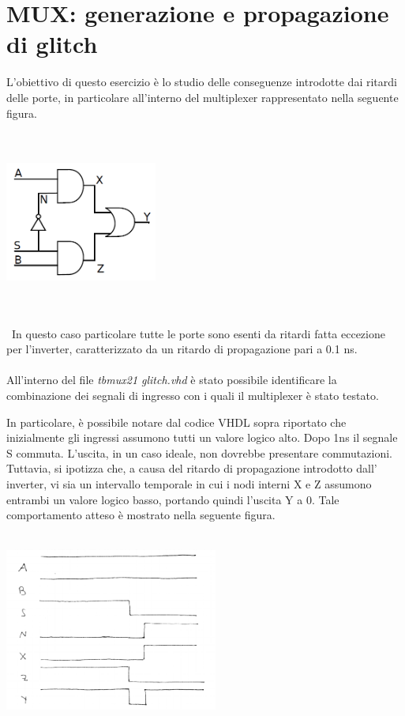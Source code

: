 \documentclass[11pt,  english, makeidx, a4paper, titlepage, oneside]{book}
\newenvironment{listato}{\footnotesize} {\normalsize }
\begin{document}
\section{MUX: generazione e propagazione di glitch}
L'obiettivo di questo esercizio è lo studio delle conseguenze 
introdotte dai ritardi delle porte, in particolare all'interno del
multiplexer rappresentato nella seguente figura.
\\\\\
\centerline{\includegraphics[width=5cm]{./img/Lab_1/Es_4/Mux.png}}
\\\\\
In questo caso particolare tutte le porte sono esenti da ritardi fatta
eccezione per l'inverter, caratterizzato da un ritardo di propagazione
pari a 0.1 ns.
\\\\
All'interno del file \textit{tb\textunderscore mux21\textunderscore
glitch.vhd} è stato possibile identificare la combinazione 
dei segnali di ingresso con i quali il multiplexer è stato
testato.
\begin{center}
\begin{listato}
	\centerline{}
\end{listato}
\end{center}
In particolare, è possibile notare dal codice VHDL sopra riportato
che inizialmente gli ingressi assumono tutti un valore logico alto.
Dopo 1ns il segnale S commuta. L'uscita, in un caso ideale, non dovrebbe
presentare commutazioni.
\\
Tuttavia, si ipotizza che, a causa del ritardo di propagazione introdotto dall'
inverter, vi sia un intervallo temporale in cui i nodi interni X e Z 
assumono entrambi un valore logico basso, portando quindi l'uscita Y a 0. Tale comportamento atteso è mostrato nella seguente figura.
\\\\
\centerline{\includegraphics[width=7cm]{./img/Lab_1/Es_4/Mux_plot.png}}
\end{document}

